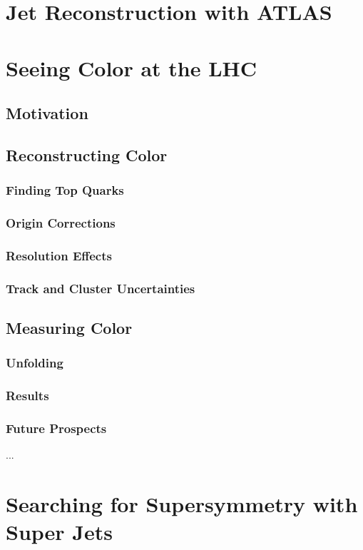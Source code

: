 \documentclass{report}
\begin{document}
\chapter{Jet Reconstruction with ATLAS}


\chapter{Seeing Color at the LHC}
\label{chapter:color}
\section{Motivation}
\section{Reconstructing Color}
	\subsection{Finding Top Quarks}
	\subsection{Origin Corrections}
	\subsection{Resolution Effects}
	\subsection{Track and Cluster Uncertainties}
\section{Measuring Color}
	\subsection{Unfolding}
	\subsection{Results}
	\subsection{Future Prospects}
		...

\chapter{Searching for Supersymmetry with Super Jets}
\label{chapter:search}
\end{document}
